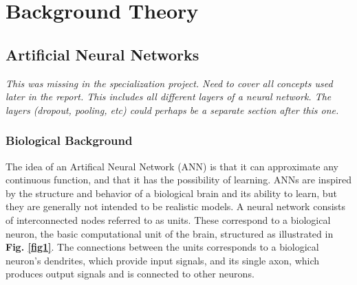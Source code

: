 
\chapter{Background Theory}

\section{Artificial Neural Networks}

\textit{This was missing in the specialization project. Need to cover all concepts used later in the report. This includes all different layers of a neural network. The layers (dropout, pooling, etc) could perhaps be a separate section after this one.}

\subsection{Biological Background}

The idea of an Artifical Neural Network (ANN) is that it can approximate any continuous function, and that it has the possibility of learning. ANNs are inspired by the structure and behavior of a biological brain and its ability to learn, but they are generally not intended to be realistic models. A neural network consists of interconnected nodes referred to as units. These correspond to a biological neuron, the basic computational unit of the brain, structured as illustrated in \textbf{Fig. \ref{fig1}}. The connections between the units corresponds to a biological neuron's dendrites, which provide input signals, and its single axon, which produces output signals and is connected to other neurons. \\

